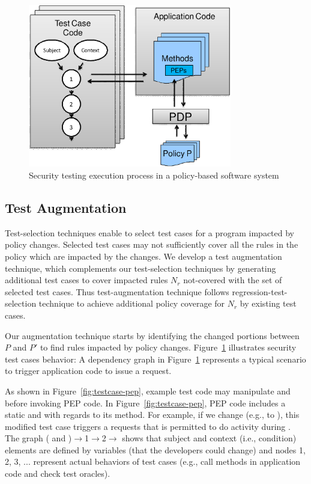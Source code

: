\begin{figure}[t]
  \centering
     \includegraphics[width=3.5in]{testaugument.eps}
    \vspace{-4pt}
 \caption{\label{fig:testexecution}Security testing execution process in a policy-based software system}
  \vspace{-10pt}
 \vspace{+3pt}
\end{figure}

\subsection{Test Augmentation}
\label{subsec:testaugmentation}
Test-selection techniques enable to select test cases for a program impacted by policy changes. Selected test cases may 
not sufficiently cover all the rules in the policy which are impacted by the changes. 
We develop a test augmentation technique, which complements our test-selection techniques by generating additional test cases to 
cover impacted rules $N_r$ not-covered with the set of selected test cases. Thus test-augmentation technique follows regression-test-selection technique to achieve
additional policy coverage for $N_r$ by existing test cases.

Our augmentation technique starts by identifying the changed portions between $P$ and $P'$ to find rules impacted by policy changes.
Figure~\ref{fig:testexecution} illustrates security test cases behavior: 
A dependency graph in Figure~\ref{fig:testexecution} represents a typical scenario to trigger application code to issue a request.

As shown in Figure~\ref{fig:testcase-pep}, example test code may manipulate
 and  before invoking  PEP code. In Figure~\ref{fig:testcase-pep}, PEP
code includes a static  and  with regards to its method.
For example, if we change  (e.g.,  to ), this modified test case
triggers  a requests that  is permitted to do  activity during .
The graph ( and )$\rightarrow$1$\rightarrow$2$\rightarrow$ shows that subject and context (i.e., condition) elements are defined by variables (that
the developers could change) and nodes 1, 2, 3, ... represent actual behaviors of test cases (e.g., call methods in application
code and check test oracles).

